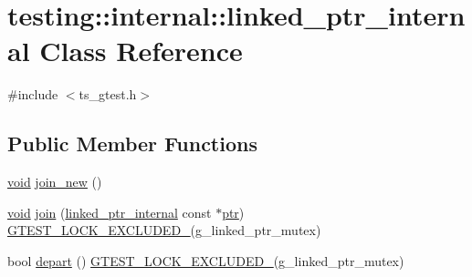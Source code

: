 \hypertarget{classtesting_1_1internal_1_1linked__ptr__internal}{\section{testing\-:\-:internal\-:\-:linked\-\_\-ptr\-\_\-internal Class Reference}
\label{classtesting_1_1internal_1_1linked__ptr__internal}
}


{\ttfamily \#include $<$ts\-\_\-gtest.\-h$>$}

\subsection*{Public Member Functions}
\begin{DoxyCompactItemize}
\item 
\hyperlink{legacy_8hpp_a8bb47f092d473522721002c86c13b94e}{void} \hyperlink{classtesting_1_1internal_1_1linked__ptr__internal_a742af1f65df2d5e2b7198a1b74264a83}{join\-\_\-new} ()
\item 
\hyperlink{legacy_8hpp_a8bb47f092d473522721002c86c13b94e}{void} \hyperlink{classtesting_1_1internal_1_1linked__ptr__internal_acd5a341459f7e81b10b4112d8c764e2a}{join} (\hyperlink{classtesting_1_1internal_1_1linked__ptr__internal}{linked\-\_\-ptr\-\_\-internal} const $\ast$\hyperlink{core__c_8h_a166529da793cc1ef241cff347f3db5a5}{ptr}) \hyperlink{ts__gtest_8h_a69abff5a4efdd07bd5faebe3dd318d06}{G\-T\-E\-S\-T\-\_\-\-L\-O\-C\-K\-\_\-\-E\-X\-C\-L\-U\-D\-E\-D\-\_\-}(g\-\_\-linked\-\_\-ptr\-\_\-mutex)
\item 
bool \hyperlink{classtesting_1_1internal_1_1linked__ptr__internal_a8699e539d9702d363ef0351012d1b3ca}{depart} () \hyperlink{ts__gtest_8h_a69abff5a4efdd07bd5faebe3dd318d06}{G\-T\-E\-S\-T\-\_\-\-L\-O\-C\-K\-\_\-\-E\-X\-C\-L\-U\-D\-E\-D\-\_\-}(g\-\_\-linked\-\_\-ptr\-\_\-mutex)
\end{DoxyCompactItemize}


